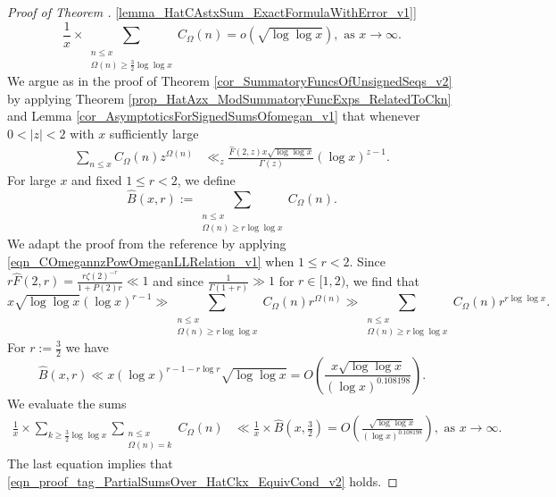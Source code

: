 \documentclass[11pt,reqno,a4letter]{article}
\newcommand{\hlocalref}[1]{\hyperref[#1]{\ref{#1}}}
\numberwithin{equation}{section}
\numberwithin{figure}{section}
\numberwithin{table}{section}
\newcommand{\cf}{\textit{cf.\ }}
\theoremstyle{plain}
\numberwithin{theorem}{section}
\theoremstyle{definition}
\begin{document}
\begin{proof}[Proof of Theorem \hlocalref{lemma_HatCAstxSum_ExactFormulaWithError_v1}]
\begin{equation}
\label{eqn_proof_tag_PartialSumsOver_HatCkx_EquivCond_v2} 
\frac{1}{x} \times 
     \sum\limits_{\substack{n \leq x \\ \Omega(n) \geq \frac{3}{2} \log\log x}} C_{\Omega}(n)
     = o\left(\sqrt{\log\log x}\right), \text{ as } x \rightarrow \infty. 
\end{equation} 
We argue as in the proof of Theorem \hlocalref{cor_SummatoryFuncsOfUnsignedSeqs_v2} 
by applying Theorem \hlocalref{prop_HatAzx_ModSummatoryFuncExps_RelatedToCkn} and 
Lemma \hlocalref{cor_AsymptoticsForSignedSumsOfomegan_v1}
that whenever $0 < |z| < 2$ with $x$ sufficiently large 
\begin{align}
\label{eqn_COmegannzPowOmeganLLRelation_v1} 
\sum_{n \leq x} C_{\Omega}(n) z^{\Omega(n)} & \ll_z 
     \frac{\widehat{F}(2, z) x \sqrt{\log\log x}}{\Gamma(z)} (\log x)^{z-1}. 
\end{align}
For large $x$ and fixed $1 \leq r < 2$, we define 
\[
\widehat{B}(x, r) := \sum_{\substack{n \leq x \\ \Omega(n) \geq r\log\log x}} 
     C_{\Omega}(n). 
\]
We adapt the proof from the reference \cite[\cf Thm.\ 7.20; \S 7.4]{MV} by 
applying \eqref{eqn_COmegannzPowOmeganLLRelation_v1} when $1 \leq r < 2$. 
Since $r \widehat{F}(2, r) = \frac{r \zeta(2)^{-r}}{1+P(2)r} \ll 1$ and since 
$\frac{1}{\Gamma(1+r)} \gg 1$ for $r \in [1, 2)$, 
we find that 
\[
x \sqrt{\log\log x} (\log x)^{r-1} \gg \sum_{\substack{n \leq x \\ \Omega(n) \geq r\log\log x}} 
     C_{\Omega}(n) r^{\Omega(n)} \gg 
     \sum_{\substack{n \leq x \\ \Omega(n) \geq r\log\log x}} 
     C_{\Omega}(n) r^{r \log\log x}. 
\]
For $r := \frac{3}{2}$ we have 
\begin{equation}
\label{eqn_BHatxrUpperBound_v1}
\widehat{B}(x, r) \ll x (\log x)^{r-1-r\log r} \sqrt{\log\log x} = 
     O\left(\frac{x \sqrt{\log\log x}}{(\log x)^{0.108198}}\right). 
\end{equation}
We evaluate the sums 
\begin{align*}
\frac{1}{x} \times 
     \sum_{k \geq \frac{3}{2} \log\log x} \sum_{\substack{n \leq x \\ \Omega(n)=k}} 
     C_{\Omega}(n) & \ll \frac{1}{x} \times \widehat{B}\left(x, \frac{3}{2}\right) = 
     O\left(\frac{\sqrt{\log\log x}}{(\log x)^{0.108198}}\right), 
     \text{ as } x \rightarrow \infty. 
\end{align*} 
The last equation implies that 
\eqref{eqn_proof_tag_PartialSumsOver_HatCkx_EquivCond_v2} holds. 
\end{proof} 
\end{document}
